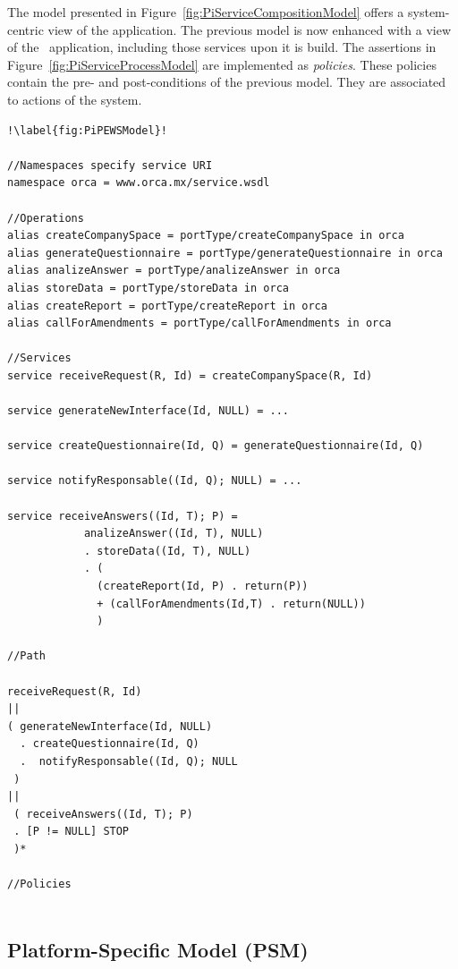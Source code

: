 The model presented in Figure~\ref{fig:PiServiceCompositionModel} offers a system-centric view of the application.
The previous model is now enhanced with a view of the \FlyingPig\ application, including those services upon  it is build.
The assertions in Figure~\ref{fig:PiServiceProcessModel} are implemented as \textit{policies}.
These policies contain the pre- and post-conditions of the previous model.
They are associated to actions of the system.


\begin{lstlisting}[label=list:flyingPigPiPEWS,caption=pi-PEWS
Specification: FlyingPig. ]!\label{fig:PiPEWSModel}!

//Namespaces specify service URI
namespace orca = www.orca.mx/service.wsdl

//Operations
alias createCompanySpace = portType/createCompanySpace in orca
alias generateQuestionnaire = portType/generateQuestionnaire in orca
alias analizeAnswer = portType/analizeAnswer in orca
alias storeData = portType/storeData in orca
alias createReport = portType/createReport in orca
alias callForAmendments = portType/callForAmendments in orca

//Services
service receiveRequest(R, Id) = createCompanySpace(R, Id)

service generateNewInterface(Id, NULL) = ...

service createQuestionnaire(Id, Q) = generateQuestionnaire(Id, Q)

service notifyResponsable((Id, Q); NULL) = ...

service receiveAnswers((Id, T); P) =
			analizeAnswer((Id, T), NULL) 
			. storeData((Id, T), NULL)
			. (
			  (createReport(Id, P) . return(P))
			  + (callForAmendments(Id,T) . return(NULL))
			  )
  
//Path

receiveRequest(R, Id)
||
( generateNewInterface(Id, NULL)
  . createQuestionnaire(Id, Q)
  .  notifyResponsable((Id, Q); NULL
 )
||
 ( receiveAnswers((Id, T); P)
 . [P != NULL] STOP
 )*	
 
//Policies 					  


\end{lstlisting}
%

\subsection{Platform-Specific Model (PSM)}

